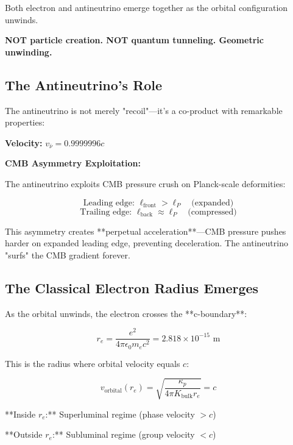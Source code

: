 Both electron and antineutrino emerge together as the orbital configuration unwinds.

\textbf{NOT particle creation. NOT quantum tunneling. Geometric unwinding.}

\subsection{The Antineutrino's Role}

The antineutrino is not merely "recoil"—it's a co-product with remarkable properties:

\textbf{Velocity:} $v_{\bar{\nu}} = 0.9999996c$

\textbf{CMB Asymmetry Exploitation:}

The antineutrino exploits CMB pressure crush on Planck-scale deformities:

\begin{equation}
\text{Leading edge: } \ell_{\text{front}} > \ell_P \quad \text{(expanded)}
\end{equation}
\begin{equation}
\text{Trailing edge: } \ell_{\text{back}} \approx \ell_P \quad \text{(compressed)}
\end{equation}

This asymmetry creates **perpetual acceleration**—CMB pressure pushes harder on expanded leading edge, preventing deceleration. The antineutrino "surfs" the CMB gradient forever.

\subsection{The Classical Electron Radius Emerges}

As the orbital unwinds, the electron crosses the **c-boundary**:

\begin{equation}
r_e = \frac{e^2}{4\pi\epsilon_0 m_e c^2} = 2.818 \times 10^{-15} \text{ m}
\end{equation}

This is the radius where orbital velocity equals $c$:

\begin{equation}
v_{\text{orbital}}(r_e) = \sqrt{\frac{\kappa_p}{4\pi K_{\text{bulk}} r_e}} = c
\end{equation}

**Inside $r_e$:** Superluminal regime (phase velocity $> c$)

**Outside $r_e$:** Subluminal regime (group velocity $< c$)


